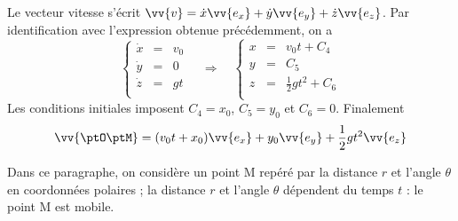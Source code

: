 
\begin{corrige}
Le vecteur vitesse s'écrit $\vv{v}=\dot{x}\vv{e_x}+\dot{y}\vv{e_y}+\dot{z}\vv{e_z}$. Par identification avec l'expression obtenue précédemment, on a 
 \[
 \left\{
 \begin{array}{ccc}
 	\dot{x}&=&v_0\\
 	\dot{y}&=&0\\
 	\dot{z}&=&gt\\
 \end{array}
\right.
\quad\Rightarrow\quad
\left\{
\begin{array}{ccc}
	x&=&v_0t+C_4\\
	y&=&C_5\\
	z&=&\frac12 gt^2+C_6\\
\end{array}
\right.
 \]
Les conditions initiales imposent $C_4=x_0$, $C_5=y_0$ et $C_6=0$. Finalement 
$$
\vv{\ptO\ptM}=(v_0 t + x_0) \vv{e_x} + y_0\vv{e_y}+ \frac12 gt^2 \vv{e_z}
$$
\end{corrige}

\finEntrainement






\medskip

                                \initialisationPartieGauche %
Dans ce paragraphe, on considère un point M repéré par la distance $r$ et l'angle $\theta$ en coordonnées polaires ; 
la distance $r$ et l'angle $\theta$ dépendent du temps $t$ : le point M est mobile.

